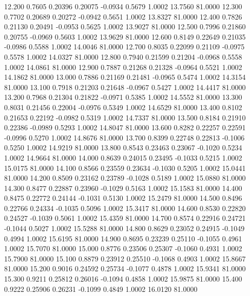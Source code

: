   12.200   0.7605   0.20396   0.20075  -0.0934   0.5679   1.0002  13.7560  81.0000
  12.300   0.7702   0.20689   0.20272  -0.0942   0.5651   1.0002  13.8327  81.0000
  12.400   0.7826   0.21130   0.20491  -0.0953   0.5625   1.0002  13.9027  81.0000
  12.500   0.7996   0.21860   0.20755  -0.0969   0.5603   1.0002  13.9629  81.0000
  12.600   0.8149   0.22649   0.21035  -0.0986   0.5588   1.0002  14.0046  81.0000
  12.700   0.8035   0.22099   0.21109  -0.0975   0.5578   1.0002  14.0327  81.0000
  12.800   0.7940   0.21599   0.21204  -0.0968   0.5558   1.0002  14.0861  81.0000
  12.900   0.7887   0.21268   0.21328  -0.0964   0.5521   1.0002  14.1862  81.0000
  13.000   0.7886   0.21169   0.21481  -0.0965   0.5474   1.0002  14.3154  81.0000
  13.100   0.7918   0.21203   0.21648  -0.0967   0.5427   1.0002  14.4417  81.0000
  13.200   0.7968   0.21304   0.21822  -0.0971   0.5385   1.0002  14.5552  81.0000
  13.300   0.8031   0.21456   0.22004  -0.0976   0.5349   1.0002  14.6529  81.0000
  13.400   0.8102   0.21653   0.22192  -0.0982   0.5319   1.0002  14.7337  81.0000
  13.500   0.8184   0.21910   0.22386  -0.0989   0.5293   1.0002  14.8047  81.0000
  13.600   0.8282   0.22257   0.22591  -0.0996   0.5270   1.0002  14.8676  81.0000
  13.700   0.8399   0.22748   0.22813  -0.1006   0.5250   1.0002  14.9219  81.0000
  13.800   0.8543   0.23463   0.23067  -0.1020   0.5234   1.0002  14.9664  81.0000
  14.000   0.8639   0.24015   0.23495  -0.1033   0.5215   1.0002  15.0175  81.0000
  14.100   0.8566   0.23559   0.23634  -0.1030   0.5205   1.0002  15.0441  81.0000
  14.200   0.8509   0.23162   0.23789  -0.1028   0.5189   1.0002  15.0880  81.0000
  14.300   0.8477   0.22887   0.23960  -0.1029   0.5163   1.0002  15.1583  81.0000
  14.400   0.8475   0.22772   0.24144  -0.1031   0.5130   1.0002  15.2479  81.0000
  14.500   0.8496   0.22766   0.24334  -0.1035   0.5096   1.0002  15.3417  81.0000
  14.600   0.8530   0.22820   0.24527  -0.1039   0.5061   1.0002  15.4359  81.0000
  14.700   0.8574   0.22916   0.24721  -0.1044   0.5027   1.0002  15.5288  81.0000
  14.800   0.8629   0.23052   0.24915  -0.1049   0.4994   1.0002  15.6195  81.0000
  14.900   0.8695   0.23239   0.25110  -0.1055   0.4961   1.0002  15.7070  81.0000
  15.000   0.8776   0.23506   0.25307  -0.1060   0.4931   1.0002  15.7900  81.0000
  15.100   0.8879   0.23912   0.25510  -0.1068   0.4903   1.0002  15.8667  81.0000
  15.200   0.9016   0.24592   0.25734  -0.1077   0.4878   1.0002  15.9341  81.0000
  15.300   0.9211   0.25812   0.26016  -0.1094   0.4858   1.0002  15.9875  81.0000
  15.400   0.9222   0.25906   0.26231  -0.1099   0.4849   1.0002  16.0120  81.0000
